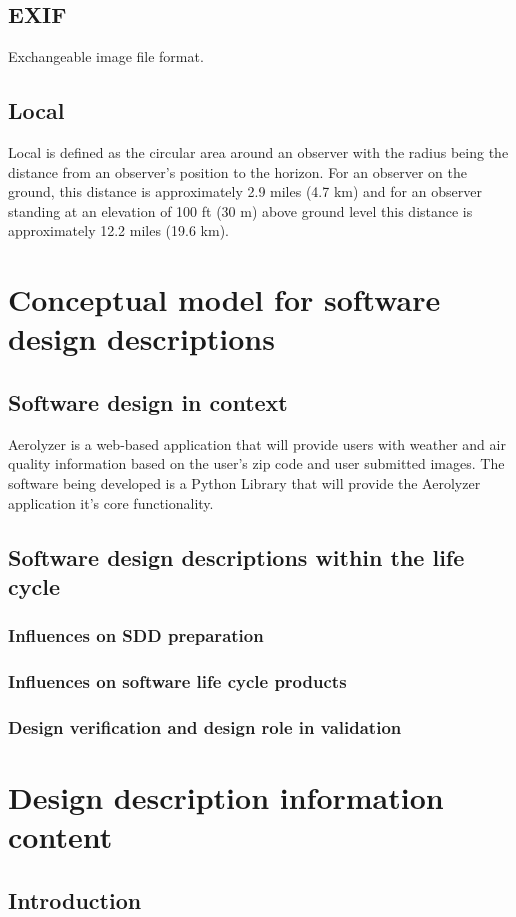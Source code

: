 \documentclass[onecolumn, draftclsnofoot,10pt, compsoc]{IEEEtran}
\begin{document}
\begin{singlespace}
	\subsection{EXIF}\label{def:exif}
		Exchangeable image file format.
	\subsection{Local}\label{def:local}
		Local is defined as the circular area around an observer with the radius being the distance from an observer's position to the horizon.
		For an observer on the ground, this distance is approximately 2.9 miles (4.7 km) and for an observer standing at an elevation of 100 ft (30 m) above ground level this distance is approximately 12.2 miles (19.6 km).
\section{Conceptual model for software design descriptions}
	\subsection{Software design in context}
		Aerolyzer is a web-based application that will provide users with weather and air quality information based on the user's zip code and user submitted images.
		The software being developed is a Python Library that will provide the Aerolyzer application it's core functionality.
	\subsection{Software design descriptions within the life cycle}
		\subsubsection{Influences on SDD preparation}
		\subsubsection{Influences on software life cycle products}
		\subsubsection{Design verification and design role in validation}
\section{Design description information content}
	\subsection{Introduction}

\end{singlespace}
\end{document}
